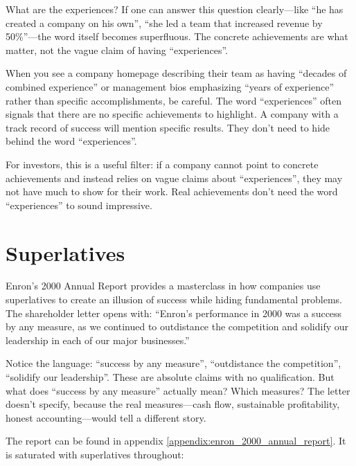 What are the experiences? If one can answer this question clearly—like ``he has created a company on his own'', ``she led a team that increased revenue by 50\%''—the word itself becomes superfluous. The concrete achievements are what matter, not the vague claim of having ``experiences''.

When you see a company homepage describing their team as having ``decades of combined experience'' or management bios emphasizing ``years of experience'' rather than specific accomplishments, be careful. The word ``experiences'' often signals that there are no specific achievements to highlight. A company with a track record of success will mention specific results. They don't need to hide behind the word ``experiences''.

For investors, this is a useful filter: if a company cannot point to concrete achievements and instead relies on vague claims about ``experiences'', they may not have much to show for their work. Real achievements don't need the word ``experiences'' to sound impressive.

\section{Superlatives}

Enron's 2000 Annual Report provides a masterclass in how companies use superlatives to create an illusion of success while hiding fundamental problems. The shareholder letter opens with: ``Enron's performance in 2000 was a success by any measure, as we continued to outdistance the competition and solidify our leadership in each of our major businesses.''

Notice the language: ``success by any measure'', ``outdistance the competition'', ``solidify our leadership''. These are absolute claims with no qualification. But what does ``success by any measure'' actually mean? Which measures? The letter doesn't specify, because the real measures—cash flow, sustainable profitability, honest accounting—would tell a different story.

The report can be found in appendix \ref{appendix:enron_2000_annual_report}. It is saturated with superlatives throughout:

